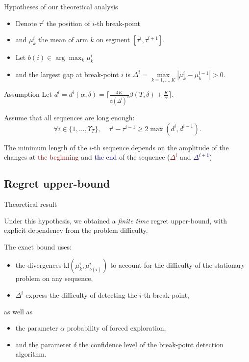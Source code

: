 \documentclass[11pt,english,ignorenonframetext,]{beamer}
\begin{document}
\begin{frame}{Hypotheses of our theoretical analysis}

  \begin{itemize}
    \item
    Denote $\tau^{i}$ the position of $i$-th break-point
    \item
    and $\mu_k^{i}$ the mean of arm $k$ on segment $[\tau^i, \tau^{i+1}]$.
    \item
    Let $b(i) \in \arg\max_k \mu_k^{i} $
    \item
    and the largest gap at break-point $i$ is
    $\Delta^{i} = \max\limits_{k=1,\dots,K} |\mu_k^{i} - \mu_k^{i-1}| >0$.
  \end{itemize}

    \begin{block}{Assumption}
      Let $d^{i} = d^{i}(\alpha,\delta) = \lceil \frac{4K}{\alpha(\Delta^{i})^2}\beta(T,\delta) + \frac{K}{\alpha} \rceil$.

      Assume that all sequences are long enough:
      \[ \forall i \in \{1,\dots,\Upsilon_T\}, \;\;\;\; \tau^{i} - \tau^{i-1} \geq 2\max( d^{i}, d^{i-1} ). \]
    \end{block}

    The minimum length of the $i$-th sequence depends on the amplitude of the changes at \textcolor{darkred}{the beginning} and \textcolor{darkblue}{the end} of the sequence (\textcolor{darkred}{$\Delta^i$} and \textcolor{darkblue}{$\Delta^{i+1}$})

\end{frame}


\subsection{\hfill{}Regret upper-bound\hfill{}}

\begin{frame}{Theoretical result}

  Under this hypothesis, we obtained a \emph{finite time}
  regret upper-bound, with explicit dependency from the problem difficulty.

  The exact bound uses:
  \begin{itemize}
    \item
    the divergences $\mathrm{kl}(\mu_{k}^{i},\mu_{b(i)}^{i})$ to account for the difficulty of the stationary problem on any sequence,
    \item
    $\Delta^{i}$ express the difficulty of detecting the $i$-th break-point,
  \end{itemize}
  as well as
  \begin{itemize}
    \item
    the parameter $\alpha$ probability of forced exploration,
    \item
    and the parameter $\delta$ the confidence level of the break-point detection algorithm.
  \end{itemize}

\end{frame}
\end{document}

